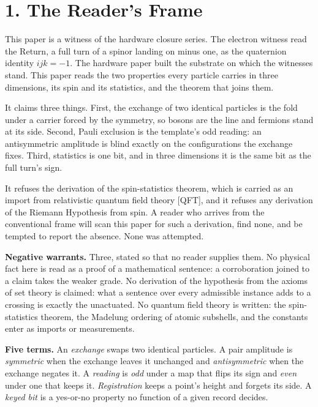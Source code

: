 \documentclass[10pt]{article}
\begin{document}
\hypertarget{the-readers-frame}{%
\section{1. The Reader's Frame}\label{the-readers-frame}}

This paper is a witness of the hardware closure series. The electron
witness read the Return, a full turn of a spinor landing on minus one,
as the quaternion identity \(ijk=-1\). The hardware paper built the
substrate on which the witnesses stand. This paper reads the two
properties every particle carries in three dimensions, its spin and its
statistics, and the theorem that joins them.

It claims three things. First, the exchange of two identical particles
is the fold under a carrier forced by the symmetry, so bosons are the
line and fermions stand at its side. Second, Pauli exclusion is the
template's odd reading: an antisymmetric amplitude is blind exactly on
the configurations the exchange fixes. Third, statistics is one bit, and
in three dimensions it is the same bit as the full turn's sign.

It refuses the derivation of the spin-statistics theorem, which is
carried as an import from relativistic quantum field theory {[}QFT{]},
and it refuses any derivation of the Riemann Hypothesis from spin. A
reader who arrives from the conventional frame will scan this paper for
such a derivation, find none, and be tempted to report the absence. None
was attempted.

\textbf{Negative warrants.} Three, stated so that no reader supplies
them. No physical fact here is read as a proof of a mathematical
sentence: a corroboration joined to a claim takes the weaker grade. No
derivation of the hypothesis from the axioms of set theory is claimed:
what a sentence over every admissible instance adds to a crossing is
exactly the unactuated. No quantum field theory is written: the
spin-statistics theorem, the Madelung ordering of atomic subshells, and
the constants enter as imports or measurements.

\textbf{Five terms.} An \emph{exchange} swaps two identical particles. A
pair amplitude is \emph{symmetric} when the exchange leaves it unchanged
and \emph{antisymmetric} when the exchange negates it. A \emph{reading}
is \emph{odd} under a map that flips its sign and \emph{even} under one
that keeps it. \emph{Registration} keeps a point's height and forgets
its side. A \emph{keyed bit} is a yes-or-no property no function of a
given record decides.
\end{document}
